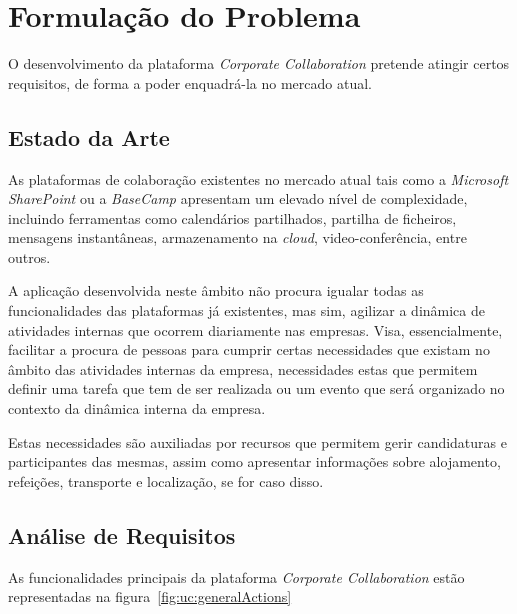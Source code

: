 \chapter{Formulação do Problema}\label{chapter:formulacaoDoProblema}

O desenvolvimento da plataforma \textit{Corporate Collaboration} pretende atingir certos requisitos, de forma a poder enquadrá-la no mercado 
atual. 


\section{Estado da Arte}\label{sec:estadoDaArte}
As plataformas de colaboração existentes no mercado atual tais como a \textit{Microsoft SharePoint} ou a \textit{BaseCamp} apresentam um elevado nível de complexidade, 
incluindo ferramentas como calendários partilhados, partilha de ficheiros, mensagens instantâneas, armazenamento na \textit{cloud}, video-conferência, entre outros. 

\par
A aplicação desenvolvida neste âmbito não procura igualar todas as funcionalidades das plataformas já existentes, 
mas sim, agilizar a dinâmica de atividades internas que ocorrem diariamente nas empresas. 
Visa, essencialmente, facilitar a procura de pessoas para cumprir certas necessidades que existam no âmbito das atividades internas da empresa, 
necessidades estas que permitem definir uma tarefa que tem de ser realizada ou um evento que será organizado no contexto da dinâmica interna da empresa. 

\par 
Estas necessidades são auxiliadas por recursos que permitem gerir candidaturas e participantes das mesmas, 
assim como apresentar informações sobre alojamento, refeições, transporte e localização, se for caso disso.

\newpage

\section{Análise de Requisitos}\label{sec:requisitos}

As funcionalidades principais da plataforma \textit{Corporate Collaboration} estão representadas na figura~\ref{fig:uc:generalActions}

